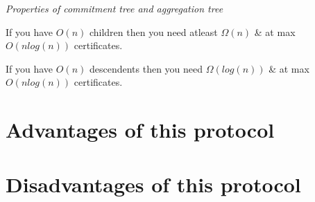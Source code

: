 \textit{Properties of commitment tree and aggregation tree}

	If you have $O(n)$ children then you need atleast $\Omega(n)$ \& at max $O(nlog(n))$ certificates.

	If you have $O(n)$ descendents then you need $\Omega(log(n))$  \& at max $O(nlog(n))$ certificates.


\section{Advantages of this protocol}
\section{Disadvantages of this protocol}
